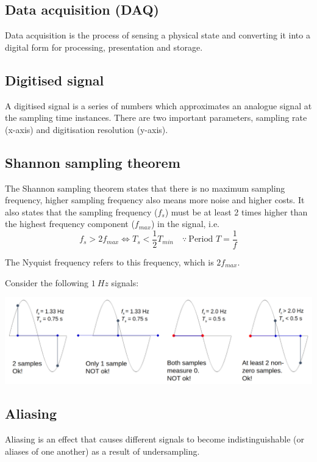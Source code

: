 \documentclass[11pt]{article}
\begin{document}
\subsection{Data acquisition (DAQ)}
\label{sec:org322be30}
Data acquisition is the process of sensing a physical state and converting it into a digital form for processing, presentation and storage.
\subsection{Digitised signal}
\label{sec:org730aab8}
A digitised signal is a series of numbers which approximates an analogue signal at the sampling time instances. There are two important parameters, sampling rate (x-axis) and digitisation resolution (y-axis).
\subsection{Shannon sampling theorem}
\label{sec:org944b22e}
The Shannon sampling theorem states that there is no maximum sampling frequency, higher sampling frequency also means more noise and higher costs. It also states that the sampling frequency (\(f_s\)) must be at least 2 times higher than the highest frequency component (\(f_{max}\)) in the signal, i.e.
\[f_s > 2f_{max} \Longleftrightarrow T_s < \frac{1}{2} T_{min} \quad \because \ \text{Period } T = \frac{1}{f}\]

The Nyquist frequency refers to this frequency, which is \(2f_{max}\).


Consider the following \(\qty{1}{Hz}\) signals:
\begin{center}
\includegraphics[width=.9\linewidth]{./images/shannon-sampling-theorem.png}
\end{center}

 \newpage
\subsection{Aliasing}
\label{sec:orga502ef6}
Aliasing is an effect that causes different signals to become indistinguishable (or aliases of one another) as a result of undersampling.
\end{document}
